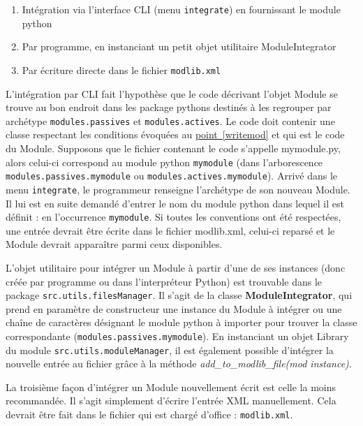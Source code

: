 \documentclass[]{article}
\newcommand{\wordlink}[2]{\hyperref[#1]{#2~\ref{#1}}}
\begin{document}
\begin{enumerate}
\item Intégration via l'interface CLI (menu \texttt{integrate}) en fournissant le module python
\item Par programme, en instanciant un petit objet utilitaire ModuleIntegrator
\item Par écriture directe dans le fichier \texttt{modlib.xml}
\end{enumerate}

\par L'intégration par CLI fait l'hypothèse que le code décrivant l'objet Module se trouve au bon endroit dans les package pythons destinés à les regrouper par archétype \texttt{modules.passives} et \texttt{modules.actives}. Le code doit contenir une classe respectant les conditions évoquées au \wordlink{writemod}{point} et qui est le code du Module. Supposons que le fichier contenant le code s'appelle mymodule.py, alors celui-ci correspond au module python \texttt{mymodule} (dans l'arborescence \texttt{modules.passives.mymodule} ou \texttt{modules.actives.mymodule}). Arrivé dans le menu \texttt{integrate}, le programmeur renseigne l'archétype de son nouveau Module. Il lui est en suite demandé d'entrer le nom du module python dans lequel il est définit : en l'occurrence \texttt{mymodule}. Si toutes les conventions ont été respectées, une entrée devrait être écrite dans le fichier modlib.xml, celui-ci reparsé et le Module devrait apparaître parmi ceux disponibles.\\

\par L'objet utilitaire pour intégrer un Module à partir d'une de ses instances (donc créée par programme ou dans l'interpréteur Python) est trouvable dans le package \texttt{src.utils.filesManager}. Il s'agit de la classe \textbf{ModuleIntegrator}, qui prend en paramètre de constructeur une instance du Module à intégrer ou une chaîne de caractères désignant le module python à importer pour trouver la classe correspondante (\texttt{modules.passives.mymodule}). En instanciant un objet Library du module \texttt{src.utils.moduleManager}, il est également possible d'intégrer la nouvelle entrée au fichier grâce à la méthode \textit{add\_to\_modlib\_file(mod instance)}.\\

\par La troisième façon d'intégrer un Module nouvellement écrit est celle la moins recommandée. Il s'agit simplement d'écrire l'entrée XML manuellement. Cela devrait être fait dans le fichier qui est chargé d'office : \texttt{modlib.xml}.
\end{document}
